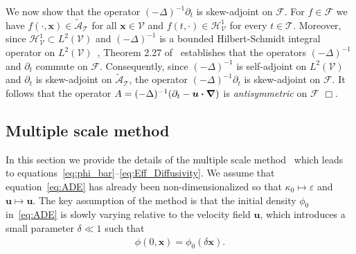 \documentclass[leqno,onefignum,onetabnum]{siamltex1213}
\newcommand{\Tc}{\mathcal{T}}
\newcommand{\Vc}{\mathcal{V}}
\newcommand{\Hs}{\mathscr{H}}
\newcommand{\As}{\mathscr{A}}
\newcommand{\Fs}{\mathscr{F}}
\newcommand\bnabla{\mbox{\boldmath${\nabla}$}}
\providecommand\bcdot{\boldsymbol{\cdot}}
\newcommand{\vecx}{\boldsymbol{x}}
\newcommand{\vecu}{\boldsymbol{u}}
\begin{document}
%
We now show that the operator $(-\Delta)^{-1}\partial_t$ is skew-adjoint on
$\Fs$. For $f\in\Fs$ we have $f(\cdot,\vecx)\in\tilde{\As}_{\Tc}$ for all
$\vecx\in\Vc$ and $f(t,\cdot)\in\Hs^1_{\Vc}$ for every $t\in\Tc$. Moreover,
since $\Hs^1_{\Vc}\subset L^2(\Vc)$ and $(-\Delta)^{-1}$ is a bounded
Hilbert-Schmidt integral operator on $L^2(\Vc)$~\cite{Stakgold:BVP:2000},
Theorem 2.27 of~\cite{Folland:99} establishes that the operators
$(-\Delta)^{-1}$ and $\partial_t$ commute on $\Fs$. Consequently, since
$(-\Delta)^{-1}$ is self-adjoint on $L^2(\Vc)$ and $\partial_t$ is skew-adjoint on
$\tilde{\As}_{\Tc}$, the operator $(-\Delta)^{-1}\partial_t$ is skew-adjoint on
$\Fs$. It follows that the operator
$A=(-\Delta)^{-1}(\partial_t-\vecu\bcdot\bnabla)$ is \emph{antisymmetric} on
$\Fs$ $\Box$.  


\newpage
\subsection{Multiple scale method}\label{sec:Multiscal_Method}
%
In this section we provide the details of the multiple scale
method~\cite{McLaughlin:SIAM_JAM:780,Papanicolaou:1981:36:8,Papanicolaou:RF-835,Bensoussan:Book:1978} 
which leads to
equations~\eqref{eq:phi_bar}--\eqref{eq:Eff_Diffusivity}. We assume
that 
equation~\eqref{eq:ADE} has already been non-dimensionalized so that
$\kappa_0\mapsto\varepsilon$ and $\vecu \mapsto\vecu $. The key assumption of the method is
that the initial density $\phi_0$ in~\eqref{eq:ADE} is slowly
varying relative to the velocity field $\vecu $, which introduces a
small parameter $\delta\ll1$ such that  
% 
\begin{align}\label{eq:IC} 
  \phi(0,\vecx)=\phi_0(\delta\vecx).
\end{align}
%
\end{document}
